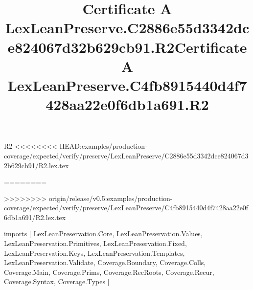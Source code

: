 \begin{lexlean}{R2}
<<<<<<<< HEAD:examples/production-coverage/expected/verify/preserve/LexLeanPreserve/C2886e55d3342dce824067d32b629cb91/R2.lex.tex
\title{Certificate A LexLeanPreserve.C2886e55d3342dce824067d32b629cb91.R2}
========
\title{Certificate A LexLeanPreserve.C4fb8915440d4f7428aa22e0f6db1a691.R2}
>>>>>>>> origin/release/v0.5:examples/production-coverage/expected/verify/preserve/LexLeanPreserve/C4fb8915440d4f7428aa22e0f6db1a691/R2.lex.tex
\begin{coremodule}
imports [
  LexLeanPreservation.Core,
  LexLeanPreservation.Values,
  LexLeanPreservation.Primitives,
  LexLeanPreservation.Fixed,
  LexLeanPreservation.Keys,
  LexLeanPreservation.Templates,
  LexLeanPreservation.Validate,
  Coverage.Boundary,
  Coverage.Colls,
  Coverage.Main,
  Coverage.Prims,
  Coverage.RecRoots,
  Coverage.Recur,
  Coverage.Syntax,
  Coverage.Types
]


\end{coremodule}
\end{lexlean}
